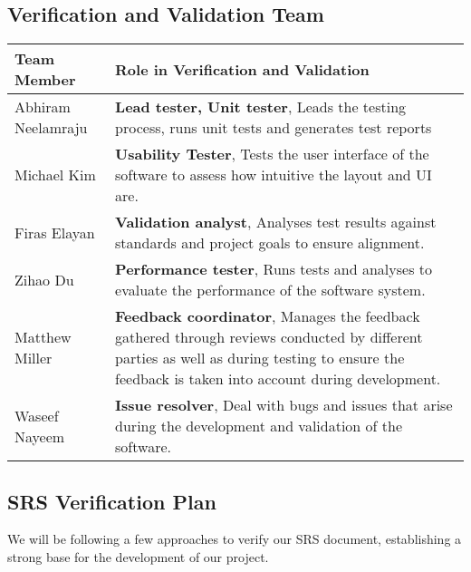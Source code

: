 \documentclass[12pt, titlepage]{article}
\begin{document}
\subsection{Verification and Validation Team}

\begin{table}[H]
  \centering
  \begin{tabular}{|p{}|p{}|}
  \hline
  \textbf{Team Member} & \textbf{Role in Verification and Validation} \\
  \hline
  Abhiram Neelamraju & \textbf{Lead tester, Unit tester}, Leads the testing process, runs unit tests and generates test reports \\
  \hline
  Michael Kim & \textbf{Usability Tester}, Tests the user interface of the software to assess how intuitive the layout and UI are. \\
  \hline
  Firas Elayan & \textbf{Validation analyst}, Analyses test results against standards and project goals to ensure alignment. \\
  \hline
  Zihao Du & \textbf{Performance tester}, Runs tests and analyses to evaluate the performance of the software system. \\
  \hline
  Matthew Miller & \textbf{Feedback coordinator}, Manages the feedback gathered through reviews conducted by different parties as well as during testing to ensure the feedback is taken into account during development. \\
  \hline
  Waseef Nayeem & \textbf{Issue resolver}, Deal with bugs and issues that arise during the development and validation of the software. \\
  \hline
  \end{tabular}
\end{table}    

\subsection{SRS Verification Plan}

We will be following a few approaches to verify our SRS document, establishing a strong base for the development of our project.
\end{document}
